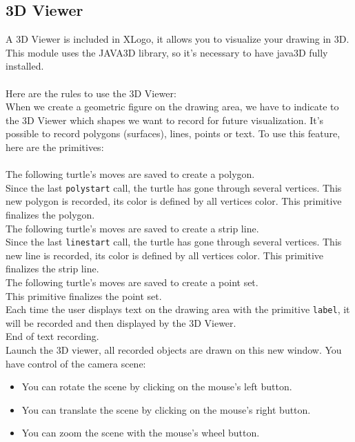 \subsection{3D Viewer}
A 3D Viewer is included in XLogo, it allows you to visualize your drawing in 3D. This module uses the JAVA3D library, so it's necessary to have java3D fully installed.\\ \\
Here are the rules to use the 3D Viewer:\\
When we create a geometric figure on the drawing area, we have to indicate to the 3D Viewer which shapes we want to record for future visualization. It's possible to record polygons (surfaces), lines, points or text. To use this feature, here are the primitives:\\ \\
The following turtle's moves are saved to create a polygon. \\
Since the last \texttt{polystart} call, the turtle has gone through several vertices. This new polygon is recorded, its color is defined by all vertices color. This primitive finalizes the polygon. \\
The following turtle's moves are saved to create a strip line. \\
Since the last \texttt{linestart} call, the turtle has gone through several vertices. This new line is recorded, its color is defined by all vertices color. This primitive finalizes the strip line. \\
The following turtle's moves are saved to create a point set. \\
This primitive finalizes the point set.\\
Each time the user displays text on the drawing area with the primitive \texttt{label}, it will be recorded and then displayed by the 3D Viewer.\\
End of text recording.\\
Launch the 3D viewer, all recorded objects are drawn on this new window. You have control of the camera scene:
\begin{itemize}
\item You can rotate the scene by clicking on the mouse's left button.
\item You can translate the scene by clicking on the mouse's right button.
\item You can zoom the scene with the mouse's wheel button.
\end{itemize}
